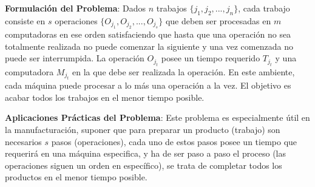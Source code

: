 \documentclass[14pt]{extarticle}
\begin{document}
\textbf{Formulación del Problema}: Dados $n$ trabajos $\{ j_1, j_2, ..., j_n  \}$, cada trabajo consiste en $s$ operaciones $\{ O_{j_1}, O_{j_2}, ..., O_{j_s} \}$ que deben ser procesadas en $m$ computadoras en ese orden satisfaciendo que hasta que una operación no sea totalmente realizada no puede comenzar la siguiente y una vez comenzada no puede ser interrumpida. La operación $O_{j_t}$ posee un tiempo requerido $T_{j_t}$ y una computadora $M_{j_t}$ en la que debe ser realizada la operación. En este ambiente, cada máquina puede procesar a lo más una operación a la vez. El objetivo es acabar todos los trabajos en el menor tiempo posible. 

\textbf{Aplicaciones Prácticas del Problema}: Este problema es especialmente útil en la manufacturación, suponer que para preparar un producto (trabajo) son necesarios $s$ pasos (operaciones), cada uno de estos pasos posee un tiempo que requerirá en una máquina especifica, y ha de ser paso a paso el proceso (las operaciones siguen un orden en específico), se trata de completar todos los productos en el menor tiempo posible.  
\end{document}
